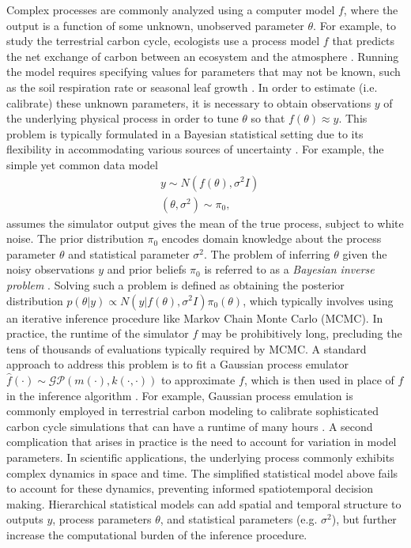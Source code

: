 \documentclass[12pt]{article}
\begin{document}
Complex processes are commonly analyzed using a computer model $f$, where the output is a function of some unknown, unobserved parameter $\theta$.
For example, to study the terrestrial carbon cycle, ecologists use a process model $f$ 
that predicts the net exchange of carbon between an ecosystem and the atmosphere \cite{Friedlingstein, Waring}. Running the model requires specifying values for parameters that 
may not be known, such as the soil respiration rate or seasonal leaf growth \cite{Fer}. In order to estimate (i.e. calibrate) these unknown parameters, it is necessary to obtain observations $y$ 
of the underlying physical process in order to tune $\theta$ so that $f(\theta) \approx y$. This problem is typically formulated in a Bayesian statistical setting due to its flexibility in accommodating
various sources of uncertainty \cite{Kennedy, Clark}. For example, the simple yet common data model\begin{align*}
&y \sim N(f(\theta), \sigma^2 I) \\
&(\theta, \sigma^2) \sim \pi_0,
\end{align*}
assumes the simulator output gives the mean of the true process, subject to white noise. The prior distribution $\pi_0$ encodes domain knowledge about the 
process parameter $\theta$ and statistical parameter $\sigma^2$. The problem of inferring $\theta$ given the noisy observations $y$ and prior beliefs $\pi_0$ is referred to as a \textit{Bayesian inverse problem} \cite{Stuart}. Solving such a problem is defined 
 as obtaining the posterior distribution $p(\theta|y) \propto N(y|f(\theta), \sigma^2 I)\pi_0(\theta)$, which typically involves using an iterative inference procedure like Markov Chain Monte Carlo (MCMC). In practice, the runtime of the simulator $f$ may be prohibitively long, precluding the tens of thousands of evaluations typically required by MCMC. A standard approach to address this problem is to fit a Gaussian process 
emulator $\hat{f}(\cdot) \sim \mathcal{GP}(m(\cdot), k(\cdot, \cdot))$ to approximate $f$, which is then used in place of $f$ in the inference algorithm \cite{Kennedy, Fer, Cleary}. For example, Gaussian process emulation is commonly employed in terrestrial carbon modeling to calibrate sophisticated carbon cycle simulations that can have a runtime of many hours \cite{Fer}. A second complication that arises in practice is the need to account for variation in model
parameters. In scientific applications, the underlying process commonly exhibits complex dynamics in space and time. The simplified statistical model above fails to account for these dynamics, preventing informed spatiotemporal decision making. Hierarchical statistical models can add spatial and temporal structure to outputs $y$, process parameters $\theta$, and statistical parameters (e.g. $\sigma^2$), but further increase the computational burden of the inference procedure. 
 
\end{document}
